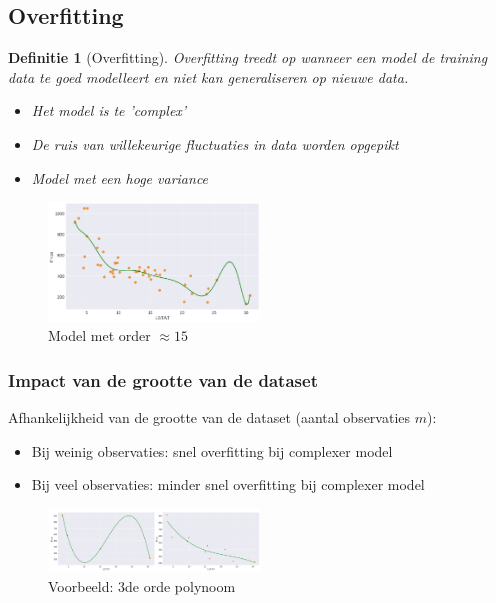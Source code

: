 \documentclass{article}
\newtheorem{theorem}{Definitie}[section]
\begin{document}
\subsection{Overfitting}

\begin{theorem}[Overfitting]
Overfitting treedt op wanneer een model de training data te goed modelleert en niet kan
    generaliseren op nieuwe data.  

\begin{itemize}
    \item Het model is te 'complex'
    \item De ruis van willekeurige fluctuaties in data worden opgepikt
    \item Model met een hoge variance
\end{itemize}
\end{theorem}

\begin{figure}[H]
    \centering
    \includegraphics[width=0.5\textwidth]{overfitting.png}
    \caption{Model met order $\approx 15$}
\end{figure}

\subsubsection{Impact van de grootte van de dataset}

Afhankelijkheid van de grootte van de dataset (aantal observaties $m$):

\begin{itemize}
    \item Bij weinig observaties: snel overfitting bij complexer model
    \item Bij veel observaties: minder snel overfitting bij complexer model
\end{itemize}

\begin{figure}[H]
    \centering
    \includegraphics[width=0.5\textwidth]{overfitting2.png}
    \caption{Voorbeeld: 3de orde polynoom}
\end{figure}
\end{document}
